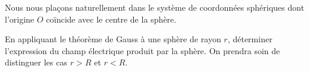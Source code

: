 \documentclass[11pt,fleqn]{book} %
\newcommand{\dd}{\mathrm{d}}
\begin{document}
Nous nous plaçons naturellement dans le système de coordonnées sphériques dont l'origine $O$ coïncide avec le centre de la sphère. 

\begin{capex}
En appliquant le théorème de Gauss à une sphère de rayon $r$, déterminer l'expression du champ électrique produit par la sphère. On prendra soin de distinguer les cas $r>R$ et $r<R$.
\end{capex}

%
%
%
%
\end{document}

